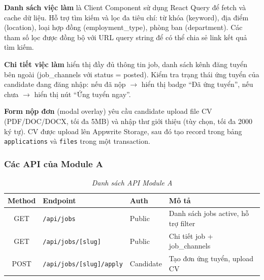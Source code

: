 \textbf{Danh sách việc làm} là Client Component sử dụng React Query để fetch và cache dữ liệu. Hỗ trợ tìm kiếm và lọc đa tiêu chí: từ khóa (keyword), địa điểm (location), loại hợp đồng (employment\_type), phòng ban (department). Các tham số lọc được đồng bộ với URL query string để có thể chia sẻ link kết quả tìm kiếm.

\textbf{Chi tiết việc làm} hiển thị đầy đủ thông tin job, danh sách kênh đăng tuyển bên ngoài (job\_channels với status = posted). Kiểm tra trạng thái ứng tuyển của candidate đang đăng nhập: nếu đã nộp $\to$ hiển thị badge ``Đã ứng tuyển'', nếu chưa $\to$ hiển thị nút ``Ứng tuyển ngay''.

\textbf{Form nộp đơn} (modal overlay) yêu cầu candidate upload file CV (PDF/DOC/DOCX, tối đa 5MB) và nhập thư giới thiệu (tùy chọn, tối đa 2000 ký tự). CV được upload lên Appwrite Storage, sau đó tạo record trong bảng \texttt{applications} và \texttt{files} trong một transaction.

\subsubsection*{Các API của Module A}
\begin{table}[H]
    \centering
    \renewcommand{\arraystretch}{1.3}
    \begin{tabular}{|c|l|l|p{5cm}|}
        \hline
        \textbf{Method} & \textbf{Endpoint} & \textbf{Auth} & \textbf{Mô tả} \\ \hline
        GET & \texttt{/api/jobs} & Public & Danh sách jobs active, hỗ trợ filter \\ \hline
        GET & \texttt{/api/jobs/[slug]} & Public & Chi tiết job + job\_channels \\ \hline
        POST & \texttt{/api/jobs/[slug]/apply} & Candidate & Tạo đơn ứng tuyển, upload CV \\ \hline
    \end{tabular}
    \caption{\textit{Danh sách API Module A}}
\end{table}


